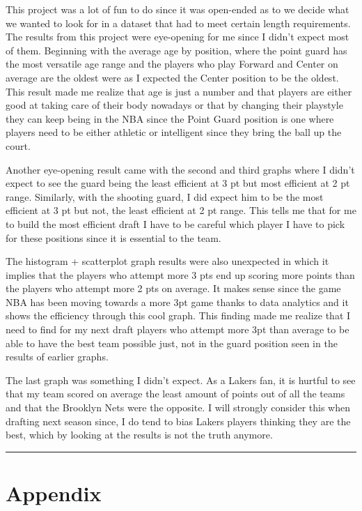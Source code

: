 \documentclass[
]{article}
\begin{document}
This project was a lot of fun to do since it was open-ended as to we
decide what we wanted to look for in a dataset that had to meet certain
length requirements. The results from this project were eye-opening for
me since I didn't expect most of them. Beginning with the average age by
position, where the point guard has the most versatile age range and the
players who play Forward and Center on average are the oldest were as I
expected the Center position to be the oldest. This result made me
realize that age is just a number and that players are either good at
taking care of their body nowadays or that by changing their playstyle
they can keep being in the NBA since the Point Guard position is one
where players need to be either athletic or intelligent since they bring
the ball up the court.

Another eye-opening result came with the second and third graphs where I
didn't expect to see the guard being the least efficient at 3 pt but
most efficient at 2 pt range. Similarly, with the shooting guard, I did
expect him to be the most efficient at 3 pt but not, the least efficient
at 2 pt range. This tells me that for me to build the most efficient
draft I have to be careful which player I have to pick for these
positions since it is essential to the team.

The histogram + scatterplot graph results were also unexpected in which
it implies that the players who attempt more 3 pts end up scoring more
points than the players who attempt more 2 pts on average. It makes
sense since the game NBA has been moving towards a more 3pt game thanks
to data analytics and it shows the efficiency through this cool graph.
This finding made me realize that I need to find for my next draft
players who attempt more 3pt than average to be able to have the best
team possible just, not in the guard position seen in the results of
earlier graphs.

The last graph was something I didn't expect. As a Lakers fan, it is
hurtful to see that my team scored on average the least amount of points
out of all the teams and that the Brooklyn Nets were the opposite. I
will strongly consider this when drafting next season since, I do tend
to bias Lakers players thinking they are the best, which by looking at
the results is not the truth anymore.

\vspace{.2in}
\hrule
\vspace{.2in}

\hypertarget{appendix}{%
\section{Appendix}\label{appendix}}
\end{document}
